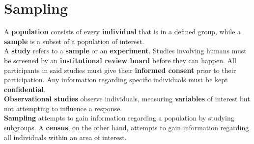 \documentclass[../AP_Statistics.tex]{subfiles}
\begin{document}
	\chapter{Sampling}
		A \textbf{population} consists of every \textbf{individual} that is in a defined group, while a \textbf{sample} is a subset of a population of interest. \\
		A \textbf{study} refers to a \textbf{sample} or an \textbf{experiment}.
		Studies involving humans must be screened by an \textbf{institutional review board} before they can happen. All participants in said studies must give their \textbf{informed consent} prior to their participation. Any information regarding specific individuals must be kept \textbf{confidential}. \\
		\textbf{Observational studies} observe individuals, measuring \textbf{variables} of interest but not attempting to influence a response. \\
		\textbf{Sampling} attempts to gain information regarding a population by studying subgroups. A \textbf{census}, on the other hand, attempts to gain information regarding all individuals within an area of interest. \\
\end{document}
